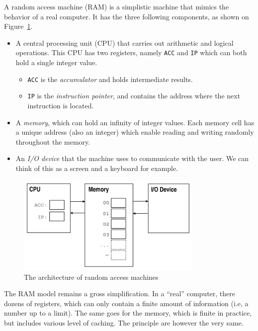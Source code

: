 \documentclass {aldast}
\begin{document}
A random access machine (RAM) is a simplistic machine that mimics the
behavior of a real computer. It has
the three following components, as shown on Figure~\ref{fig:ram}.
\begin{itemize}
\item A central processing unit (CPU) that carries out arithmetic and
  logical operations. This CPU has two registers, namely \texttt{ACC}
  and \texttt{IP} which can both hold a single integer value.
  \begin{itemize}
  \item \texttt{ACC} is the \emph{accumulator} and holds
    intermediate results.
  \item \texttt{IP} is the \emph{instruction pointer}, and contains the
    address where the next instruction is located.
  \end{itemize}
\item A \emph{memory}, which can hold an infinity of integer
  values. Each memory cell has a unique address (also an integer)
  which enable reading and writing randomly throughout the memory.
\item An \emph{I/O device} that the machine uses to communicate with the
  user. We can think of this as a screen and a keyboard for example.
\end{itemize}

\begin{figure}[htbp]
  \begin{center}
    \includegraphics[width=0.8\textwidth]{images/ram}
  \end{center}
  \caption{The architecture of random access machines}
  \label{fig:ram}
\end{figure}

The RAM model remains a gross simplification. In a ``real''
computer, there dozens of registers, which can only contain a finite
amount of information (i.e, a number up to a limit). The same goes
for the memory, which is finite in practice, but includes various
level of caching. The principle are however the very same.
\end{document}
